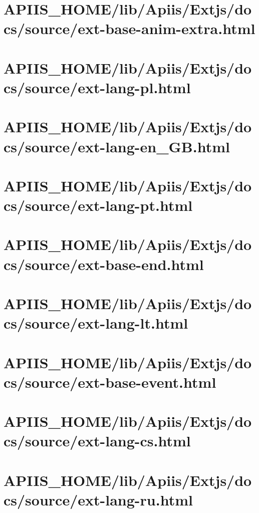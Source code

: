 \section{APIIS\_HOME/lib/Apiis/Extjs/docs/source/ext-base-anim-extra.html} 
\section{APIIS\_HOME/lib/Apiis/Extjs/docs/source/ext-lang-pl.html} 
\section{APIIS\_HOME/lib/Apiis/Extjs/docs/source/ext-lang-en\_GB.html} 
\section{APIIS\_HOME/lib/Apiis/Extjs/docs/source/ext-lang-pt.html} 
\section{APIIS\_HOME/lib/Apiis/Extjs/docs/source/ext-base-end.html} 
\section{APIIS\_HOME/lib/Apiis/Extjs/docs/source/ext-lang-lt.html} 
\section{APIIS\_HOME/lib/Apiis/Extjs/docs/source/ext-base-event.html} 
\section{APIIS\_HOME/lib/Apiis/Extjs/docs/source/ext-lang-cs.html} 
\section{APIIS\_HOME/lib/Apiis/Extjs/docs/source/ext-lang-ru.html} 

